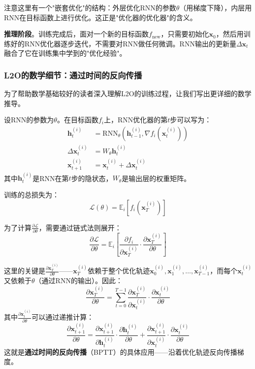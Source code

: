 \documentclass[lang=cn,zihao=-4,a4paper,fontset=windows]{beautybook}
\renewcommand{\partial}{∂}
\begin{document}
注意这里有一个"嵌套优化"的结构：外层优化RNN的参数$\theta$（用梯度下降），内层用RNN在目标函数上进行优化。这正是"优化器的优化器"的含义。

\textbf{推理阶段}。训练完成后，面对一个新的目标函数$f_{\text{new}}$，只需要初始化$\mathbf{x}_0$，然后用训练好的RNN优化器逐步迭代，不需要对RNN做任何微调。RNN输出的更新量$\Delta \mathbf{x}_t$融合了它在训练集中学到的"优化经验"。

\subsubsection{L2O的数学细节：通过时间的反向传播}

为了帮助数学基础较好的读者深入理解L2O的训练过程，让我们写出更详细的数学推导。

设RNN的参数为$\theta$。在目标函数$f_i$上，RNN优化器的第$t$步可以写为：
\begin{align}
\mathbf{h}_t^{(i)} &= \text{RNN}_\theta(\mathbf{h}_{t-1}^{(i)}, \nabla f_i(\mathbf{x}_t^{(i)})) \label{eq:rnn-state} \\
\Delta \mathbf{x}_t^{(i)} &= W_\theta \mathbf{h}_t^{(i)} \label{eq:rnn-output} \\
\mathbf{x}_{t+1}^{(i)} &= \mathbf{x}_t^{(i)} + \Delta \mathbf{x}_t^{(i)} \label{eq:update}
\end{align}
其中$\mathbf{h}_t^{(i)}$是RNN在第$t$步的隐状态，$W_\theta$是输出层的权重矩阵。

训练的总损失为：
\[
\mathcal{L}(\theta) = \mathbb{E}_{i} \left[ f_i(\mathbf{x}_T^{(i)}) \right]
\]

为了计算$\frac{\partial \mathcal{L}}{\partial \theta}$，需要通过链式法则展开：
\[
\frac{\partial \mathcal{L}}{\partial \theta} = \mathbb{E}_i \left[ \frac{\partial f_i}{\partial \mathbf{x}_T^{(i)}} \cdot \frac{\partial \mathbf{x}_T^{(i)}}{\partial \theta} \right]
\]

这里的关键是$\frac{\partial \mathbf{x}_T^{(i)}}{\partial \theta}$——$\mathbf{x}_T^{(i)}$依赖于整个优化轨迹$\mathbf{x}_0^{(i)}, \mathbf{x}_1^{(i)}, \dots, \mathbf{x}_{T-1}^{(i)}$，而每个$\mathbf{x}_t^{(i)}$又依赖于$\theta$（通过RNN的输出）。因此：
\[
\frac{\partial \mathbf{x}_T^{(i)}}{\partial \theta} = \sum_{t=0}^{T-1} \frac{\partial \mathbf{x}_T^{(i)}}{\partial \mathbf{x}_t^{(i)}} \cdot \frac{\partial \mathbf{x}_t^{(i)}}{\partial \theta}
\]
其中$\frac{\partial \mathbf{x}_t^{(i)}}{\partial \theta}$可以通过递推计算：
\[
\frac{\partial \mathbf{x}_{t+1}^{(i)}}{\partial \theta} = \frac{\partial \mathbf{x}_{t+1}^{(i)}}{\partial \mathbf{h}_t^{(i)}} \cdot \frac{\partial \mathbf{h}_t^{(i)}}{\partial \theta} + \frac{\partial \mathbf{x}_{t+1}^{(i)}}{\partial \mathbf{x}_t^{(i)}} \cdot \frac{\partial \mathbf{x}_t^{(i)}}{\partial \theta}
\]
这就是\textbf{通过时间的反向传播}（BPTT）的具体应用——沿着优化轨迹反向传播梯度。
\end{document}
